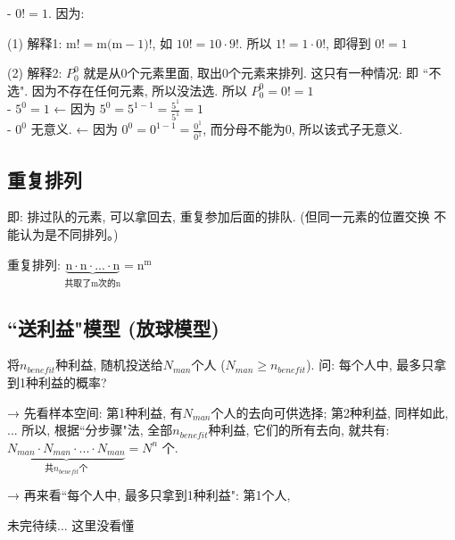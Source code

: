 \documentclass[UTF8]{ctexart}
\begin{document}
	
	- $0!=1$.  因为: 
	
	(1) 解释1: $\text{m!}=\text{m(m}-1\text{)!}$, 如 $10! =10 \cdot 9!$. 所以 $1! = 1 \cdot 0!$, 即得到 $0!=1$
	
	(2) 解释2: $P_{0}^{0}$ 就是从0个元素里面, 取出0个元素来排列. 这只有一种情况: 即 ``不选". 因为不存在任何元素, 所以没法选. 所以 $P_0^0=0!=1$ \\
	
	- $5^0 =1$ ← 因为 $5^0=5^{1-1}=\frac{5^1}{5^1}=1$ \\	
	- $0^0$ 无意义. ← 因为 $0^0=0^{1-1}=\frac{0^1}{0^1}$, 而分母不能为0, 所以该式子无意义.
	
	
	
	\subsection{重复排列}
	
	即: 排过队的元素, 可以拿回去, 重复参加后面的排队.  (但同一元素的位置交换 不能认为是不同排列。)
	
	重复排列: $\underset{\text{共取了m次的n}}{\underbrace{\text{n}\cdot \text{n}\cdot ...\cdot \text{n}}}=\text{n}^{\text{m}}	$ \\
	
		
	\subsection{``送利益"模型 (放球模型)}
	
	将$n_{benefit}$种利益, 随机投送给$N_{man}$个人 ($N_{man}\ge n_{benefit}$). 问: 每个人中, 最多只拿到1种利益的概率?
	
	→ 先看样本空间: 第1种利益, 有$N_{man}$个人的去向可供选择; 第2种利益, 同样如此, ... 所以, 根据``分步骤"法, 全部$n_{benefit}$种利益, 它们的所有去向, 就共有: $\underset{\text{共}n_{benefit}\text{个}}{\underbrace{N_{man}\cdot N_{man}\cdot ...\cdot N_{man}}}=N^n	$ 个.
	
	→ 再来看``每个人中, 最多只拿到1种利益": 第1个人,
	
	未完待续... 这里没看懂
	
	
	
%		
%		
%		
%		
%		
%		
%
%	
	
\end{document}
